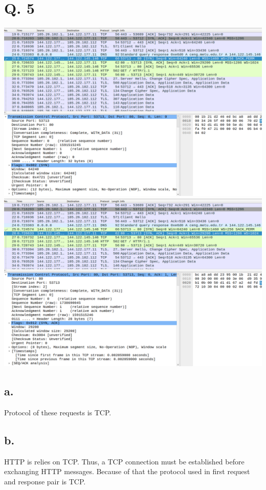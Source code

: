 \documentclass[11pt]{article}
\begin{document}
	\section*{Q. 5}
	
	\begin{center}
		\includegraphics[scale=0.25]{tcppair}
		\includegraphics[scale=0.25]{tcppair2}
	\end{center}
	
	\subsection*{a.}
	Protocol of these requests is TCP.
	\subsection*{b.}
	HTTP is relies on TCP. Thus, a TCP connection must be established before exchanging HTTP messages. Because of that the protocol used in first request and response pair is TCP.
\end{document}

